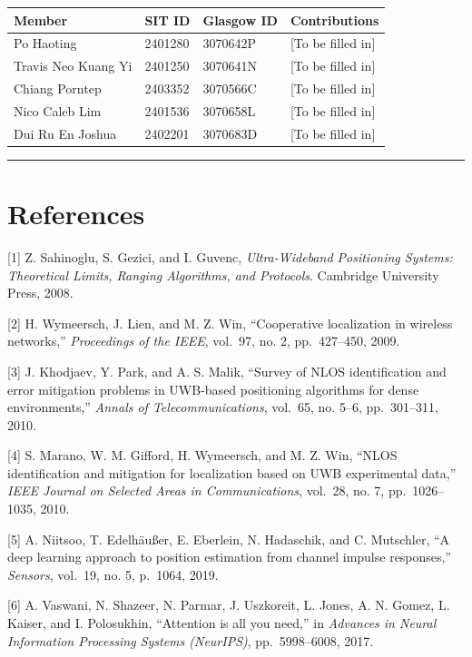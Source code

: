 \documentclass[12pt,a4paper]{article}
\newcounter{none}
\begin{document}
{\def\LTcaptype{none} %
\begin{longtable}[]{@{}llll@{}}
\toprule\noalign{}
Member & SIT ID & Glasgow ID & Contributions \\
\midrule\noalign{}
\endhead
\bottomrule\noalign{}
\endlastfoot
Po Haoting & 2401280 & 3070642P & {[}To be filled in{]} \\
Travis Neo Kuang Yi & 2401250 & 3070641N & {[}To be filled in{]} \\
Chiang Porntep & 2403352 & 3070566C & {[}To be filled in{]} \\
Nico Caleb Lim & 2401536 & 3070658L & {[}To be filled in{]} \\
Dui Ru En Joshua & 2402201 & 3070683D & {[}To be filled in{]} \\
\end{longtable}
}

\begin{center}\rule{0.5\linewidth}{0.5pt}\end{center}

\section{References}\label{references}

{[}1{]} Z. Sahinoglu, S. Gezici, and I. Guvenc, \emph{Ultra-Wideband
Positioning Systems: Theoretical Limits, Ranging Algorithms, and
Protocols}. Cambridge University Press, 2008.

{[}2{]} H. Wymeersch, J. Lien, and M. Z. Win, ``Cooperative localization
in wireless networks,'' \emph{Proceedings of the IEEE}, vol.~97, no. 2,
pp.~427--450, 2009.

{[}3{]} J. Khodjaev, Y. Park, and A. S. Malik, ``Survey of NLOS
identification and error mitigation problems in UWB-based positioning
algorithms for dense environments,'' \emph{Annals of
Telecommunications}, vol.~65, no. 5--6, pp.~301--311, 2010.

{[}4{]} S. Marano, W. M. Gifford, H. Wymeersch, and M. Z. Win, ``NLOS
identification and mitigation for localization based on UWB experimental
data,'' \emph{IEEE Journal on Selected Areas in Communications},
vol.~28, no. 7, pp.~1026--1035, 2010.

{[}5{]} A. Niitsoo, T. Edelhäußer, E. Eberlein, N. Hadaschik, and C.
Mutschler, ``A deep learning approach to position estimation from
channel impulse responses,'' \emph{Sensors}, vol.~19, no. 5, p.~1064,
2019.

{[}6{]} A. Vaswani, N. Shazeer, N. Parmar, J. Uszkoreit, L. Jones, A. N.
Gomez, L. Kaiser, and I. Polosukhin, ``Attention is all you need,'' in
\emph{Advances in Neural Information Processing Systems (NeurIPS)},
pp.~5998--6008, 2017.
\end{document}
